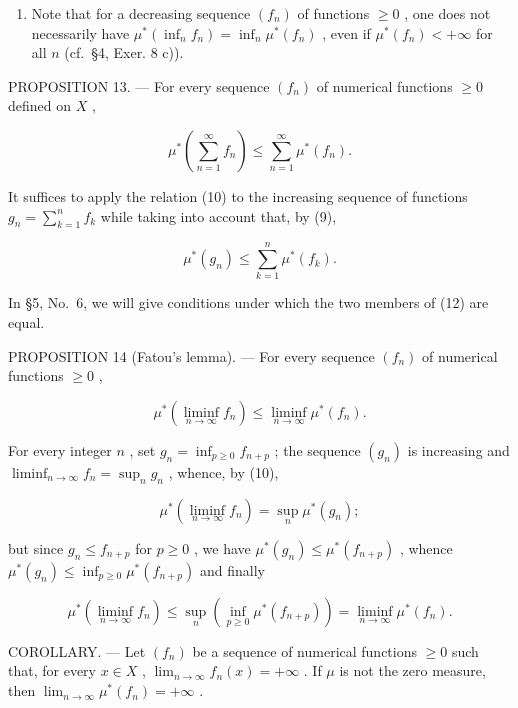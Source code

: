 \begin{enumerate}
\def\labelenumi{\arabic{enumi})}
\setcounter{enumi}{1}
\tightlist
\item
  Note that for a decreasing sequence \((f_n)\) of functions \(\geqslant 0\) , one does not necessarily have \(\mu^{*}(\inf_{n} f_n) = \inf_{n} \mu^{*}(f_n)\) , even if \(\mu^{*}(f_n) < +\infty\) for all \(n\) (cf.~§4, Exer. 8 c)).
\end{enumerate}

PROPOSITION 13. --- For every sequence \((f_n)\) of numerical functions \(\geqslant 0\) defined on \(X\) ,

\[
\mu^ {*} \left(\sum_ {n = 1} ^ {\infty} f _ {n}\right) \leqslant \sum_ {n = 1} ^ {\infty} \mu^ {*} (f _ {n}).\tag{12}
\]

It suffices to apply the relation (10) to the increasing sequence of functions \(g_{n} = \sum_{k=1}^{n} f_{k}\) while taking into account that, by (9),

\[
\mu^ {*} (g _ {n}) \leqslant \sum_ {k = 1} ^ {n} \mu^ {*} (f _ {k}).
\]

In §5, No.~6, we will give conditions under which the two members of (12) are equal.

PROPOSITION 14 (Fatou's lemma). --- For every sequence \((f_{n})\) of numerical functions \(\geqslant 0\) ,

\[
\mu^ {*} \left(\liminf _ {n \to \infty} f _ {n}\right) \leqslant \liminf _ {n \to \infty} \mu^ {*} (f _ {n})  .\tag{13}
\]

For every integer \(n\) , set \(g_{n} = \inf_{p\geqslant 0}f_{n + p}\) ; the sequence \((g_n)\) is increasing and \(\liminf_{n\to \infty}f_n = \sup_n g_n\) , whence, by (10),

\[
\mu^ {*} (\liminf _ {n \to \infty} f _ {n}) = \sup _ {n} \mu^ {*} (g _ {n});
\]

but since \(g_{n} \leqslant f_{n+p}\) for \(p \geqslant 0\) , we have \(\mu^{*}(g_{n}) \leqslant \mu^{*}(f_{n+p})\) , whence \(\mu^{*}(g_{n}) \leqslant \inf_{p \geqslant 0} \mu^{*}(f_{n+p})\) and finally

\[
\mu^ {*} \left(\operatorname * {l i m i n f} _ {n \to \infty} f _ {n}\right) \leqslant \sup _ {n} \left(\inf _ {p \geqslant 0} \mu^ {*} (f _ {n + p})\right) = \operatorname * {l i m i n f} _ {n \to \infty} \mu^ {*} (f _ {n}).
\]

COROLLARY. --- Let \((f_{n})\) be a sequence of numerical functions \(\geqslant0\) such that, for every \(x\in X\) , \(\lim_{n\to\infty}f_{n}(x)=+\infty\) . If \(\mu\) is not the zero measure, then \(\lim_{n\to\infty}\mu^{*}(f_{n})=+\infty\) .

